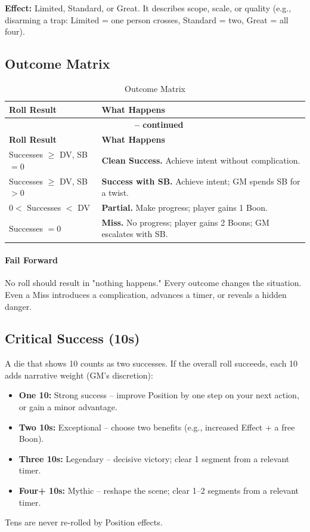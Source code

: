 \noindent \textbf{Effect:} Limited, Standard, or Great. It describes scope,
scale, or quality (e.g., disarming a trap: Limited = one person crosses,
Standard = two, Great = all four).

\subsection{Outcome Matrix}\label{subsec:outcome_matrix}

\begin{longtable}{p{2.5cm} p{10cm}}
\caption{Outcome Matrix}\label{tab:outcome_matrix}\\
\toprule
\textbf{Roll Result} & \textbf{What Happens} \\
\midrule
\endfirsthead
\multicolumn{2}{c}{{\bfseries \tablename\ \thetable{} -- continued}} \\
\toprule
\textbf{Roll Result} & \textbf{What Happens} \\
\midrule
\endhead
\bottomrule
\endfoot
Successes $\geq$ DV, SB $=0$ & \textbf{Clean Success.} Achieve intent without complication. \\
Successes $\geq$ DV, SB $>0$ & \textbf{Success with SB.} Achieve intent; GM spends SB for a twist. \\
$0 <$ Successes $<$ DV & \textbf{Partial.} Make progress; player gains 1 Boon. \\
Successes $=0$ & \textbf{Miss.} No progress; player gains 2 Boons; GM escalates with SB. \\
\end{longtable}

\paragraph{Fail Forward}
No roll should result in "nothing happens." Every outcome changes the situation.
Even a Miss introduces a complication, advances a timer, or reveals a hidden danger.

\subsection{Critical Success (10s)}\label{subsec:critical_success}

A die that shows 10 counts as two successes. If the overall roll succeeds, each
10 adds narrative weight (GM's discretion):
\begin{itemize}
    \item \textbf{One 10:} Strong success -- improve Position by one step on your
        next action, or gain a minor advantage.
    \item \textbf{Two 10s:} Exceptional -- choose two benefits (e.g., increased
        Effect + a free Boon).
    \item \textbf{Three 10s:} Legendary -- decisive victory; clear 1 segment from
        a relevant timer.
    \item \textbf{Four+ 10s:} Mythic -- reshape the scene; clear 1--2 segments
        from a relevant timer.
\end{itemize}
\noindent Tens are never re‑rolled by Position effects.

